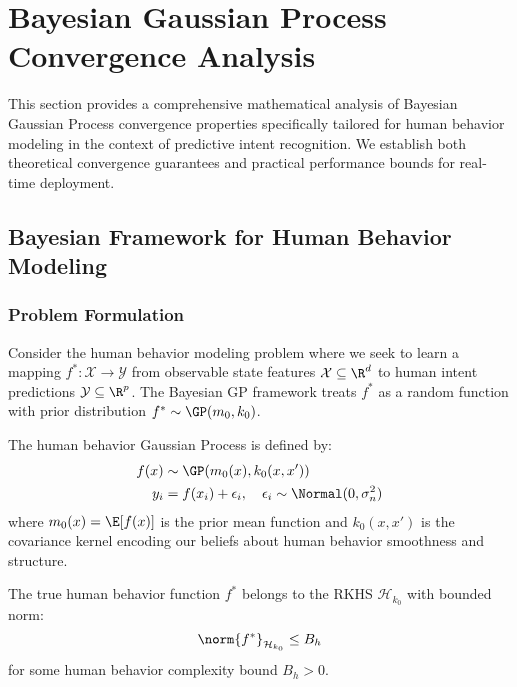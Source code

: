 \section{Bayesian Gaussian Process Convergence Analysis}

This section provides a comprehensive mathematical analysis of Bayesian Gaussian Process convergence properties specifically tailored for human behavior modeling in the context of predictive intent recognition. We establish both theoretical convergence guarantees and practical performance bounds for real-time deployment.

\subsection{Bayesian Framework for Human Behavior Modeling}

\subsubsection{Problem Formulation}

Consider the human behavior modeling problem where we seek to learn a mapping $f^*: \mathcal{X} \rightarrow \mathcal{Y}$ from observable state features $\mathcal{X} \subseteq \R^d$ to human intent predictions $\mathcal{Y} \subseteq \R^p$. The Bayesian GP framework treats $f^*$ as a random function with prior distribution $f^* \sim \GP(m_0, k_0)$.

\begin{definition}
\label{def:human_behavior_gp}
The human behavior Gaussian Process is defined by:
\begin{align}
f(x) &\sim \GP(m_0(x), k_0(x, x')) \\
y_i &= f(x_i) + \epsilon_i, \quad \epsilon_i \sim \Normal(0, \sigma_n^2)
\end{align}
where $m_0(x) = \E[f(x)]$ is the prior mean function and $k_0(x, x')$ is the covariance kernel encoding our beliefs about human behavior smoothness and structure.
\end{definition}

\begin{assumption}
\label{ass:human_behavior_regularity}
The true human behavior function $f^*$ belongs to the RKHS $\mathcal{H}_{k_0}$ with bounded norm:
$$\norm{f^*}_{\mathcal{H}_{k_0}} \leq B_h$$
for some human behavior complexity bound $B_h > 0$.
\end{assumption}

